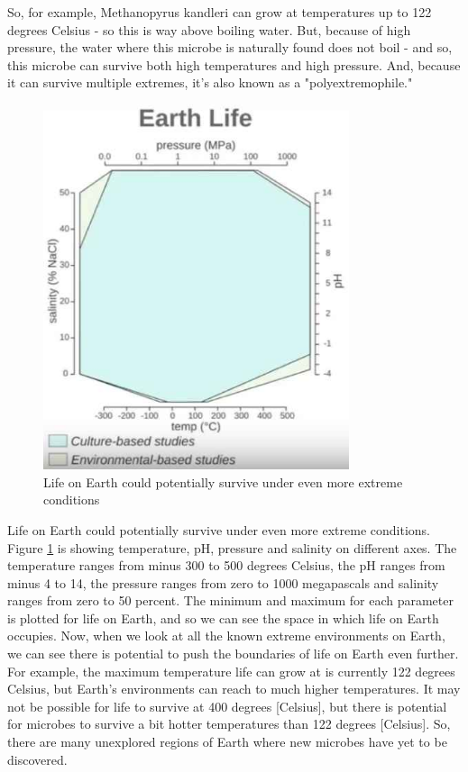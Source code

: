 \documentclass[]{article}
\begin{document}
So, for example, Methanopyrus kandleri can grow at temperatures up to 122 degrees Celsius - so this is way above boiling water.
But, because of high pressure, the water where this microbe is naturally found does not boil - and so, this microbe can survive both high temperatures and high pressure.
And, because it can survive multiple extremes, it's also known as a "polyextremophile."

\begin{figure}[H]
	\begin{center}
		\caption{Life on Earth could potentially survive
		under even more extreme conditions}\label{fig:EarthLifeExtremes}
		\includegraphics[width=0.8\textwidth]{EarthLifeExtremes}
	\end{center}
\end{figure}
Life on Earth could potentially survive
under even more extreme conditions.
Figure \ref{fig:EarthLifeExtremes} is showing
temperature, pH,
pressure and salinity on different axes.
The temperature ranges from minus 300
to 500 degrees Celsius,
the pH ranges from minus 4 to 14,
the pressure ranges from zero
to 1000 megapascals
and salinity ranges from zero
to 50 percent.
The minimum and maximum
for each parameter
is plotted for life on Earth,
and so we can see the space
in which life on Earth occupies.
Now, when we look at all the known
extreme environments on Earth,
we can see there is potential
to push the boundaries of life
on Earth even further.
For example, the maximum temperature
life can grow at
is currently 122 degrees Celsius,
but Earth's environments can reach
to much higher temperatures.
It may not be possible for life to survive
at 400 degrees [Celsius],
but there is potential for microbes
to survive a bit hotter temperatures
than 122 degrees [Celsius].
So, there are many unexplored
regions of Earth
where new microbes
have yet to be discovered.
\end{document}
